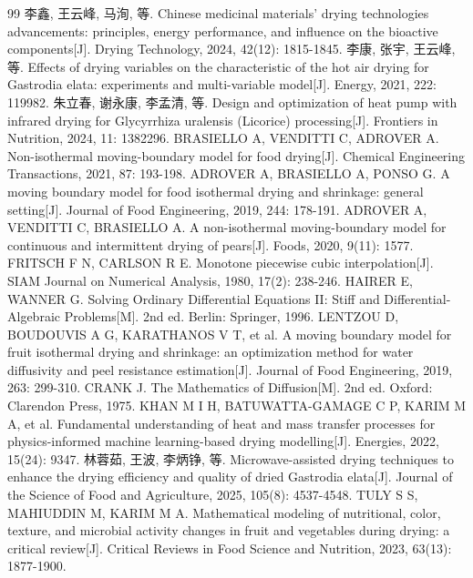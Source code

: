 \documentclass[zihao=-4,UTF8]{ctexart}
\begin{document}
\begin{thebibliography}{99}\small
{} 李鑫, 王云峰, 马洵, 等. Chinese medicinal materials' drying technologies advancements: principles, energy performance, and influence on the bioactive components[J]. Drying Technology, 2024, 42(12): 1815-1845.
 李康, 张宇, 王云峰, 等. Effects of drying variables on the characteristic of the hot air drying for Gastrodia elata: experiments and multi-variable model[J]. Energy, 2021, 222: 119982.
 朱立春, 谢永康, 李孟清, 等. Design and optimization of heat pump with infrared drying for Glycyrrhiza uralensis (Licorice) processing[J]. Frontiers in Nutrition, 2024, 11: 1382296.
 BRASIELLO A, VENDITTI C, ADROVER A. Non-isothermal moving-boundary model for food drying[J]. Chemical Engineering Transactions, 2021, 87: 193-198.
 ADROVER A, BRASIELLO A, PONSO G. A moving boundary model for food isothermal drying and shrinkage: general setting[J]. Journal of Food Engineering, 2019, 244: 178-191.
 ADROVER A, VENDITTI C, BRASIELLO A. A non-isothermal moving-boundary model for continuous and intermittent drying of pears[J]. Foods, 2020, 9(11): 1577.
 FRITSCH F N, CARLSON R E. Monotone piecewise cubic interpolation[J]. SIAM Journal on Numerical Analysis, 1980, 17(2): 238-246.
 HAIRER E, WANNER G. Solving Ordinary Differential Equations II: Stiff and Differential-Algebraic Problems[M]. 2nd ed. Berlin: Springer, 1996.
 LENTZOU D, BOUDOUVIS A G, KARATHANOS V T, et al. A moving boundary model for fruit isothermal drying and shrinkage: an optimization method for water diffusivity and peel resistance estimation[J]. Journal of Food Engineering, 2019, 263: 299-310.
 CRANK J. The Mathematics of Diffusion[M]. 2nd ed. Oxford: Clarendon Press, 1975.
 KHAN M I H, BATUWATTA-GAMAGE C P, KARIM M A, et al. Fundamental understanding of heat and mass transfer processes for physics-informed machine learning-based drying modelling[J]. Energies, 2022, 15(24): 9347.
 林蓉茹, 王波, 李炳铮, 等. Microwave-assisted drying techniques to enhance the drying efficiency and quality of dried Gastrodia elata[J]. Journal of the Science of Food and Agriculture, 2025, 105(8): 4537-4548.
 TULY S S, MAHIUDDIN M, KARIM M A. Mathematical modeling of nutritional, color, texture, and microbial activity changes in fruit and vegetables during drying: a critical review[J]. Critical Reviews in Food Science and Nutrition, 2023, 63(13): 1877-1900.
\end{thebibliography}
\end{document}
